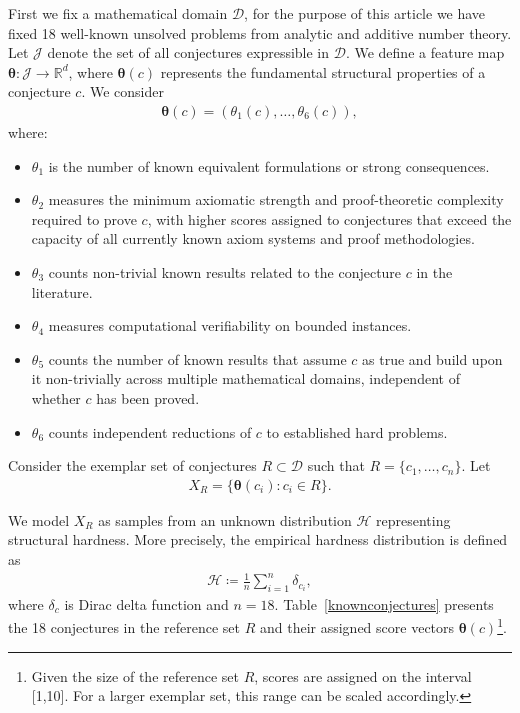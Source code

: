 \documentclass[11pt,reqno]{amsart}
\theoremstyle{plain}\newtheorem{theorem}{Theorem}[section]
\numberwithin{equation}{section}
\begin{document}
First we fix a mathematical domain $\mathcal{D}$, for the purpose of this article we have fixed 18 well-known unsolved problems from analytic and additive number theory. Let $\mathcal{J}$ denote the set of all conjectures expressible in $\mathcal{D}$. We define a feature map ${\bm{\theta}}: \mathcal{J}\to\mathbb{R}^d$, where ${\bm{\theta}}(c)$ represents the fundamental structural properties of a conjecture $c$. We consider
\begin{align*}
{\bm{\theta}}(c)
=(\theta_1(c),\ldots,\theta_6(c)),
\end{align*}
where:
\begin{itemize}
\item $\theta_1$ is the number of known equivalent formulations or strong consequences.
\item $\theta_2$ measures the minimum axiomatic strength and proof-theoretic complexity required to prove $c$, with higher scores assigned to conjectures that exceed the capacity of all currently known axiom systems and proof methodologies.
\item $\theta_3$ counts non-trivial known results related to the conjecture $c$ in the literature.
\item $\theta_4$ measures computational verifiability on bounded instances.
\item $\theta_5$ counts the number of known results that assume $c$ as true and build upon it non-trivially across multiple mathematical domains, independent of whether $c$ has been proved.
\item $\theta_6$ counts independent reductions of $c$ to established hard problems.
\end{itemize}

\noindent
Consider the exemplar set of conjectures $R\subset\mathcal{D}$ such that $R=\{c_1,\ldots,c_n\}$. Let
\begin{align*}
X_R
=\{{\bm{\theta}}(c_i):c_i\in R\}.
\end{align*}

\noindent
We model $X_R$ as samples from an unknown distribution $\mathcal{H}$ representing structural hardness. More precisely, the empirical hardness distribution is defined as
\begin{align*}
\mathcal{H}
\coloneqq \frac{1}{n}\sum_{i=1}^{n}\delta_{c_i},
\end{align*}
where $\delta_c$ is Dirac delta function and $n=18$. Table~\ref{knownconjectures} presents the 18 conjectures in the reference set $R$ and their assigned score vectors $\bm{\theta}(c)$\footnote{Given the size of the reference set $R$, scores are assigned on the interval [1,10]. For a larger exemplar set, this range can be scaled accordingly.}.
\end{document}
